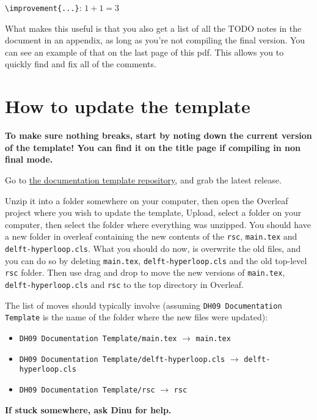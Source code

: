 \vspace{5em}

\verb|\improvement{...}|: $1+1=3$

\vspace{5em}

What makes this useful is that you also get a list of all the TODO notes in the document in an appendix, as long as you're not compiling the final version. You can see an example of that on the last page of this pdf. This allows you to quickly find and fix all of the comments.

\section*{How to update the template}

\textbf{\color{red} To make sure nothing breaks, start by noting down the current version of the template! You can find it on the title page if compiling in non final mode.}

Go to \href{https://github.com/delft-hyperloop/DH09-Documentation-Template/releases}{\color{HyperloopGreen} the documentation template repository}, and grab the latest release.

Unzip it into a folder somewhere on your computer, then open the Overleaf project where you wish to update the template, Upload, select a folder on your computer, then select the folder where everything was unzipped. You should have a new folder in overleaf containing the new contents of the \verb|rsc|, \verb|main.tex| and \verb|delft-hyperloop.cls|. What you should do now, is overwrite the old files, and you can do so by deleting \verb|main.tex|, \verb|delft-hyperloop.cls| and the old top-level \verb|rsc| folder. Then use drag and drop to move the new versions of \verb|main.tex|, \verb|delft-hyperloop.cls| and \verb|rsc| to the top directory in Overleaf.

The list of moves should typically involve (assuming \verb|DH09 Documentation Template| is the name of the folder where the new files were updated):

\begin{itemize}
    \item \verb|DH09 Documentation Template/main.tex| $\to$ \verb|main.tex|
    \item \verb|DH09 Documentation Template/delft-hyperloop.cls| $\to$ \verb|delft-hyperloop.cls|
    \item \verb|DH09 Documentation Template/rsc| $\to$ \verb|rsc|
\end{itemize}

\textbf{If stuck somewhere, ask Dinu for help.}